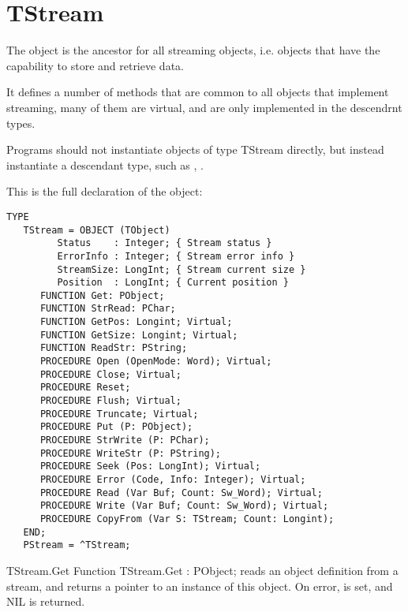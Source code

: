 \html{}

\section{TStream}
\label{se:TStream}

The  object is the ancestor for all streaming objects, i.e.
objects that have the capability to store and retrieve data.

It defines a number of methods that are common to all objects that implement
streaming, many of them are virtual, and are only implemented in the
descendrnt types.

Programs should not instantiate objects of type TStream directly, but
instead instantiate a descendant type, such as ,
.

This is the full declaration of the  object:
\begin{verbatim}
TYPE
   TStream = OBJECT (TObject)
         Status    : Integer; { Stream status }
         ErrorInfo : Integer; { Stream error info }
         StreamSize: LongInt; { Stream current size }
         Position  : LongInt; { Current position }
      FUNCTION Get: PObject;
      FUNCTION StrRead: PChar;
      FUNCTION GetPos: Longint; Virtual;
      FUNCTION GetSize: Longint; Virtual;
      FUNCTION ReadStr: PString;
      PROCEDURE Open (OpenMode: Word); Virtual;
      PROCEDURE Close; Virtual;
      PROCEDURE Reset;
      PROCEDURE Flush; Virtual;
      PROCEDURE Truncate; Virtual;
      PROCEDURE Put (P: PObject);
      PROCEDURE StrWrite (P: PChar);
      PROCEDURE WriteStr (P: PString);
      PROCEDURE Seek (Pos: LongInt); Virtual;
      PROCEDURE Error (Code, Info: Integer); Virtual;
      PROCEDURE Read (Var Buf; Count: Sw_Word); Virtual;
      PROCEDURE Write (Var Buf; Count: Sw_Word); Virtual;
      PROCEDURE CopyFrom (Var S: TStream; Count: Longint);
   END;
   PStream = ^TStream;
\end{verbatim}

\begin{function}{TStream.Get}
\Declaration
Function TStream.Get : PObject;
\Description
{} reads an object definition  from a stream, and returns
a pointer to an instance of this object.
\Errors
On error,  is set, and NIL is returned.
\SeeAlso 
{}
\end{function}

\html{}

